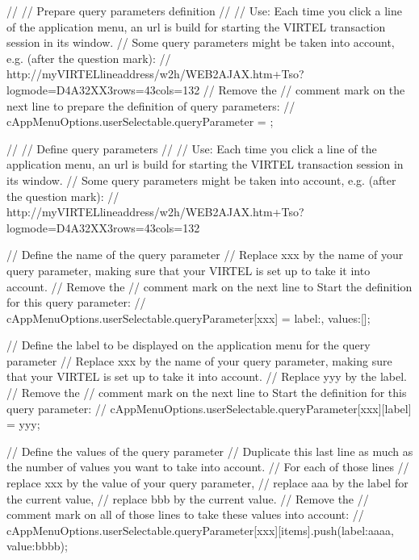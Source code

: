 \documentclass[letterpaper,10pt,english]{sphinxmanual}
\begin{document}
\begin{sphinxVerbatim}[commandchars=\\\{\}]
//
// Prepare query parameters definition
// \PYGZhy{}\PYGZhy{}\PYGZhy{}\PYGZhy{}\PYGZhy{}\PYGZhy{}\PYGZhy{}\PYGZhy{}\PYGZhy{}\PYGZhy{}\PYGZhy{}\PYGZhy{}\PYGZhy{}\PYGZhy{}\PYGZhy{}\PYGZhy{}\PYGZhy{}\PYGZhy{}\PYGZhy{}\PYGZhy{}\PYGZhy{}\PYGZhy{}\PYGZhy{}\PYGZhy{}\PYGZhy{}\PYGZhy{}\PYGZhy{}\PYGZhy{}\PYGZhy{}\PYGZhy{}\PYGZhy{}\PYGZhy{}\PYGZhy{}\PYGZhy{}\PYGZhy{}
// Use: Each time you click a line of the application menu, an url is build for starting the VIRTEL transaction session in its window.
// Some query parameters might be taken into account, e.g. (after the question mark):
// http://my\PYGZhy{}VIRTEL\PYGZhy{}line\PYGZhy{}address/w2h/WEB2AJAX.htm+Tso?logmode=D4A32XX3\PYGZam{}rows=43\PYGZam{}cols=132
// Remove the // comment mark on the next line to prepare the definition of query parameters:
// cAppMenuOptions.userSelectable.queryParameter = \PYGZob{}\PYGZcb{};


//
// Define query parameters
// \PYGZhy{}\PYGZhy{}\PYGZhy{}\PYGZhy{}\PYGZhy{}\PYGZhy{}\PYGZhy{}\PYGZhy{}\PYGZhy{}\PYGZhy{}\PYGZhy{}\PYGZhy{}\PYGZhy{}\PYGZhy{}\PYGZhy{}\PYGZhy{}\PYGZhy{}\PYGZhy{}\PYGZhy{}\PYGZhy{}\PYGZhy{}\PYGZhy{}\PYGZhy{}
// Use: Each time you click a line of the application menu, an url is build for starting the VIRTEL transaction session in its window.
// Some query parameters might be taken into account, e.g. (after the question mark):
// http://my\PYGZhy{}VIRTEL\PYGZhy{}line\PYGZhy{}address/w2h/WEB2AJAX.htm+Tso?logmode=D4A32XX3\PYGZam{}rows=43\PYGZam{}cols=132

// \PYGZhy{} Define the name of the query parameter
// Replace xxx by the name of your query parameter, making sure that your VIRTEL is set up to take it into account.
// Remove the // comment mark on the next line to Start the definition for this query parameter:
// cAppMenuOptions.userSelectable.queryParameter[\PYGZdq{}xxx\PYGZdq{}] = \PYGZob{}\PYGZdq{}label\PYGZdq{}:\PYGZdq{}\PYGZdq{}, \PYGZdq{}values\PYGZdq{}:[]\PYGZcb{};

// \PYGZhy{} Define the label to be displayed on the application menu for the query parameter
// Replace xxx by the name of your query parameter, making sure that your VIRTEL is set up to take it into account.
// Replace yyy by the label.
// Remove the // comment mark on the next line to Start the definition for this query parameter:
// cAppMenuOptions.userSelectable.queryParameter[\PYGZdq{}xxx\PYGZdq{}][\PYGZdq{}label\PYGZdq{}] = \PYGZdq{}yyy\PYGZdq{};

// \PYGZhy{} Define the values of the query parameter
// Duplicate this last line as much as the number of values you want to take into account.
// For each of those lines
// \PYGZhy{} replace xxx by the value of your query parameter,
// \PYGZhy{} replace aaa by the label for the current value,
// \PYGZhy{} replace bbb by the current value.
// Remove the // comment mark on all of those lines to take these values into account:
// cAppMenuOptions.userSelectable.queryParameter[\PYGZdq{}xxx\PYGZdq{}][\PYGZdq{}items\PYGZdq{}].push(\PYGZob{}\PYGZdq{}label\PYGZdq{}:\PYGZdq{}aaaa\PYGZdq{}, \PYGZdq{}value\PYGZdq{}:\PYGZdq{}bbbb\PYGZdq{}\PYGZcb{});



\end{sphinxVerbatim}
\end{document}

